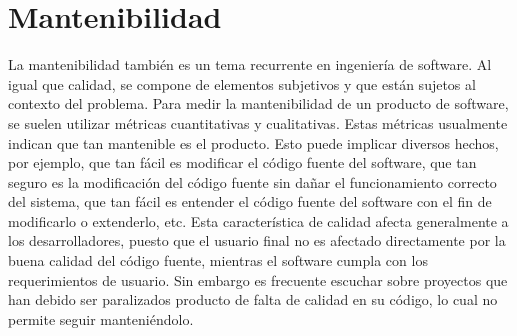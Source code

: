 \section{Mantenibilidad}

La mantenibilidad también es un tema recurrente en ingeniería de software. Al igual que calidad, se compone de elementos
subjetivos y que están sujetos al contexto del problema. Para medir la mantenibilidad de un producto de software, se suelen
utilizar métricas cuantitativas y cualitativas. Estas métricas usualmente indican que tan mantenible es el producto. 
Esto puede implicar diversos hechos, por ejemplo, que tan fácil es modificar el código fuente del software, que tan seguro
es la modificación del código fuente sin dañar el funcionamiento correcto del sistema, que tan fácil es entender el código
fuente del software con el fin de modificarlo o extenderlo, etc.
Esta característica de calidad afecta generalmente a los desarrolladores, puesto que el usuario final no es afectado directamente
por la buena calidad del código fuente, mientras el software cumpla con los requerimientos de usuario. Sin embargo es frecuente
escuchar sobre proyectos que han debido ser paralizados producto de falta de calidad en su código, lo cual no permite seguir
manteniéndolo.

